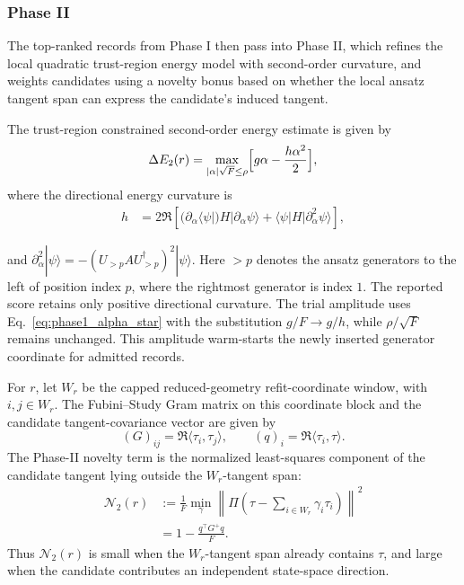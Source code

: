 \documentclass[
  reprint,
  amsmath,
  amssymb,
  aps,
  pra,
  nofootinbib,
  superscriptaddress,
  floatfix
]{revtex4-2}
\newcommand{\ket}[1]{|#1\rangle}
\begin{document}
\subsubsection{Phase II}

The top-ranked records from Phase I then pass into Phase II, which refines the local quadratic trust-region energy model with second-order curvature, and weights candidates using a novelty bonus based on whether the local ansatz tangent span can express the candidate's induced tangent. 

The trust-region constrained second-order energy estimate is given by
\begin{equation*}
\Delta E_{2}(r)
=\max_{|\alpha|\sqrt{F}\le\rho}
\Bigl[g\alpha -\frac{h\alpha^2}{2}\Bigr],
\end{equation*}
where the directional energy curvature is
\begin{align*}
h&=
2\Re\!\left[
(\partial_{\alpha}\langle \psi|)H|\partial_{\alpha}\psi\rangle
+\langle\psi|H|\partial^2_{\alpha}\psi\rangle
\right],
\end{align*}
  
and $\partial^2_{\alpha}\ket{\psi} =-(U_{>p}AU_{>p}^{\dagger})^2\ket{\psi}.$ Here \(>p\) denotes the ansatz generators to the left of position index \(p\), where the rightmost generator is index \(1\). The reported score retains only positive directional curvature. The trial amplitude uses Eq.~\eqref{eq:phase1_alpha_star} with the substitution \(g/F \to g/h\), while \(\rho/\sqrt{F}\) remains unchanged. This amplitude warm-starts the newly inserted generator coordinate for admitted records.

For \(r\), let \(W_r\) be the capped reduced-geometry refit-coordinate window, with \(i,j\in W_r\). The Fubini--Study Gram matrix on this coordinate block and the candidate tangent-covariance vector are given by
\begin{equation*}
(G)_{ij}=\Re\langle\tau_i,\tau_j\rangle,
\qquad
(q)_i=\Re\langle\tau_i,\tau\rangle.
\end{equation*}
The Phase-II novelty term is the normalized least-squares component of the candidate tangent lying outside the \(W_r\)-tangent span:
\begin{equation}
\begin{aligned}
\mathcal N_2(r)
&:=
\frac{1}{F}
\min_{\gamma}
\left\|
\Pi\left(\tau-\sum_{i\in W_r}\gamma_i\tau_i\right)
\right\|^2 \\
&=
1-
\frac{q^{\top}G^+q}{F}.
\end{aligned}
\label{eq:phase2_novelty}
\end{equation}
Thus $\mathcal N_2(r)$ is small when the \(W_r\)-tangent span already contains $\tau$, and large when the candidate contributes an independent state-space direction.
\end{document}
